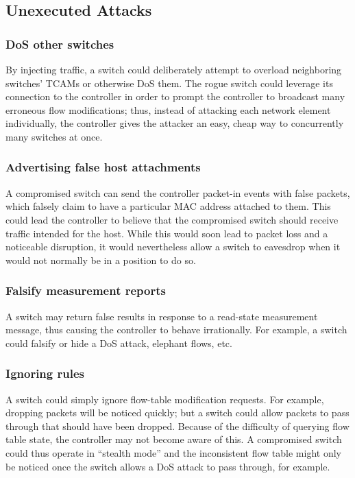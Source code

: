 \subsection{Unexecuted Attacks}
\subsubsection{DoS other switches}
By injecting traffic, a switch could deliberately attempt to overload neighboring switches' TCAMs or otherwise DoS them. The rogue switch could leverage its connection to the controller in order to prompt the controller to broadcast many erroneous flow modifications; thus, instead of attacking each network element individually, the controller gives the attacker an easy, cheap way to concurrently many switches at once. 

\subsubsection{Advertising false host attachments}
A compromised switch can send the controller packet-in events with false packets, which falsely claim to have a particular MAC address attached to them. This could lead the controller to believe that the compromised switch should receive traffic intended for the host. While this would soon lead to packet loss and a noticeable disruption, it would nevertheless allow a switch to eavesdrop when it would not normally be in a position to do so.

\subsubsection{Falsify measurement reports}
A switch may return false results in response to a read-state  measurement message, thus causing the controller to behave irrationally. For example, a switch could falsify or hide a DoS attack, elephant flows, etc.

\subsubsection{Ignoring rules}
A switch could simply ignore flow-table modification requests. For example, dropping packets will be noticed quickly; but a switch could allow packets to pass through that should have been dropped. Because of the difficulty of querying flow table state, the controller may not become aware of this. A compromised switch could thus operate in “stealth mode” and the inconsistent flow table might only be noticed once the switch allows a DoS attack to pass through, for example.

